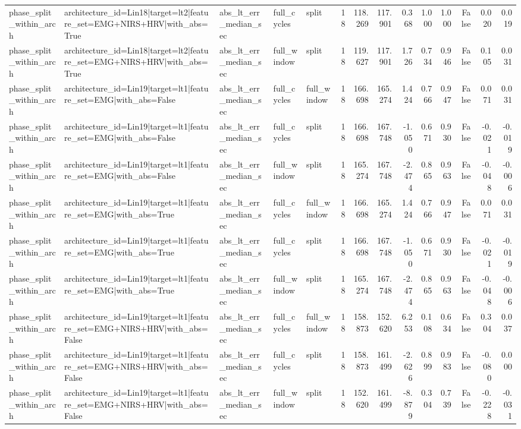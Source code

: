\begin{table}
\begin{tabular}{lllllrrrrrrrrr}
phase_split_within_arch & architecture_id=Lin18|target=lt2|feature_set=EMG+NIRS+HRV|with_abs=True & abs_lt_err_median_sec & full_cycles & split & 18 & 118.269 & 117.901 & 0.368 & 1.000 & 1.000 & False & 0.020 & 0.019 \\
phase_split_within_arch & architecture_id=Lin18|target=lt2|feature_set=EMG+NIRS+HRV|with_abs=True & abs_lt_err_median_sec & full_window & split & 18 & 119.627 & 117.901 & 1.726 & 0.734 & 0.946 & False & 0.105 & 0.031 \\
phase_split_within_arch & architecture_id=Lin19|target=lt1|feature_set=EMG|with_abs=False & abs_lt_err_median_sec & full_cycles & full_window & 18 & 166.698 & 165.274 & 1.424 & 0.766 & 0.947 & False & 0.071 & 0.031 \\
phase_split_within_arch & architecture_id=Lin19|target=lt1|feature_set=EMG|with_abs=False & abs_lt_err_median_sec & full_cycles & split & 18 & 166.698 & 167.748 & -1.050 & 0.671 & 0.930 & False & -0.021 & -0.019 \\
phase_split_within_arch & architecture_id=Lin19|target=lt1|feature_set=EMG|with_abs=False & abs_lt_err_median_sec & full_window & split & 18 & 165.274 & 167.748 & -2.474 & 0.865 & 0.963 & False & -0.048 & -0.006 \\
phase_split_within_arch & architecture_id=Lin19|target=lt1|feature_set=EMG|with_abs=True & abs_lt_err_median_sec & full_cycles & full_window & 18 & 166.698 & 165.274 & 1.424 & 0.766 & 0.947 & False & 0.071 & 0.031 \\
phase_split_within_arch & architecture_id=Lin19|target=lt1|feature_set=EMG|with_abs=True & abs_lt_err_median_sec & full_cycles & split & 18 & 166.698 & 167.748 & -1.050 & 0.671 & 0.930 & False & -0.021 & -0.019 \\
phase_split_within_arch & architecture_id=Lin19|target=lt1|feature_set=EMG|with_abs=True & abs_lt_err_median_sec & full_window & split & 18 & 165.274 & 167.748 & -2.474 & 0.865 & 0.963 & False & -0.048 & -0.006 \\
phase_split_within_arch & architecture_id=Lin19|target=lt1|feature_set=EMG+NIRS+HRV|with_abs=False & abs_lt_err_median_sec & full_cycles & full_window & 18 & 158.873 & 152.620 & 6.253 & 0.108 & 0.634 & False & 0.304 & 0.037 \\
phase_split_within_arch & architecture_id=Lin19|target=lt1|feature_set=EMG+NIRS+HRV|with_abs=False & abs_lt_err_median_sec & full_cycles & split & 18 & 158.873 & 161.499 & -2.626 & 0.899 & 0.983 & False & -0.080 & 0.000 \\
phase_split_within_arch & architecture_id=Lin19|target=lt1|feature_set=EMG+NIRS+HRV|with_abs=False & abs_lt_err_median_sec & full_window & split & 18 & 152.620 & 161.499 & -8.879 & 0.304 & 0.739 & False & -0.228 & -0.031 \\

\end{tabular}
\end{table}
